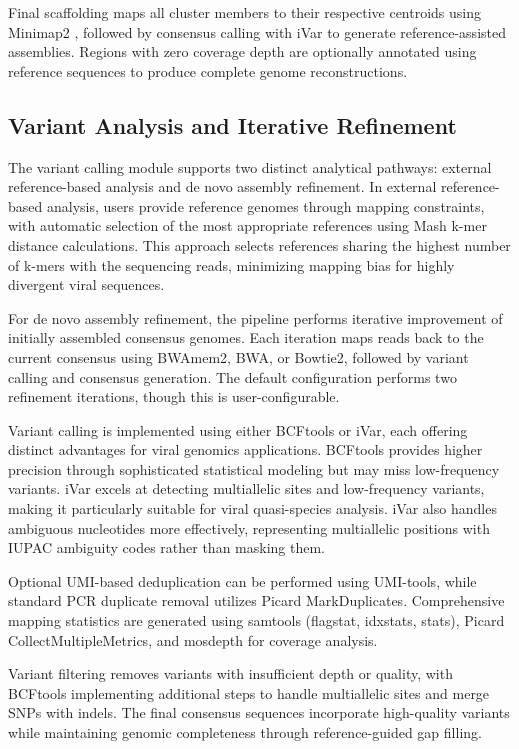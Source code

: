 \documentclass[unnumsec,webpdf,contemporary,large]{oup-authoring-template}%
\theoremstyle{thmstyleone}%
\theoremstyle{thmstyletwo}%
\theoremstyle{thmstylethree}%
\begin{document}
Final scaffolding maps all cluster members to their respective centroids using Minimap2 \cite{Li2018-gi}, followed by consensus calling with iVar to generate reference-assisted assemblies. Regions with zero coverage depth are optionally annotated using reference sequences to produce complete genome reconstructions.

\subsection{Variant Analysis and Iterative Refinement}\label{subsec_variant}

The variant calling module supports two distinct analytical pathways: external reference-based analysis and de novo assembly refinement. In external reference-based analysis, users provide reference genomes through mapping constraints, with automatic selection of the most appropriate references using Mash \cite{Ondov2019-bo} k-mer distance calculations. This approach selects references sharing the highest number of k-mers with the sequencing reads, minimizing mapping bias for highly divergent viral sequences.

For de novo assembly refinement, the pipeline performs iterative improvement of initially assembled consensus genomes. Each iteration maps reads back to the current consensus using BWAmem2, BWA, or Bowtie2, followed by variant calling and consensus generation. The default configuration performs two refinement iterations, though this is user-configurable.

Variant calling is implemented using either BCFtools or iVar, each offering distinct advantages for viral genomics applications. BCFtools provides higher precision through sophisticated statistical modeling but may miss low-frequency variants. iVar excels at detecting multiallelic sites and low-frequency variants, making it particularly suitable for viral quasi-species analysis. iVar also handles ambiguous nucleotides more effectively, representing multiallelic positions with IUPAC ambiguity codes rather than masking them.

Optional UMI-based deduplication can be performed using UMI-tools, while standard PCR duplicate removal utilizes Picard MarkDuplicates. Comprehensive mapping statistics are generated using samtools (flagstat, idxstats, stats), Picard CollectMultipleMetrics, and mosdepth for coverage analysis.

Variant filtering removes variants with insufficient depth or quality, with BCFtools implementing additional steps to handle multiallelic sites and merge SNPs with indels. The final consensus sequences incorporate high-quality variants while maintaining genomic completeness through reference-guided gap filling.
\end{document}

